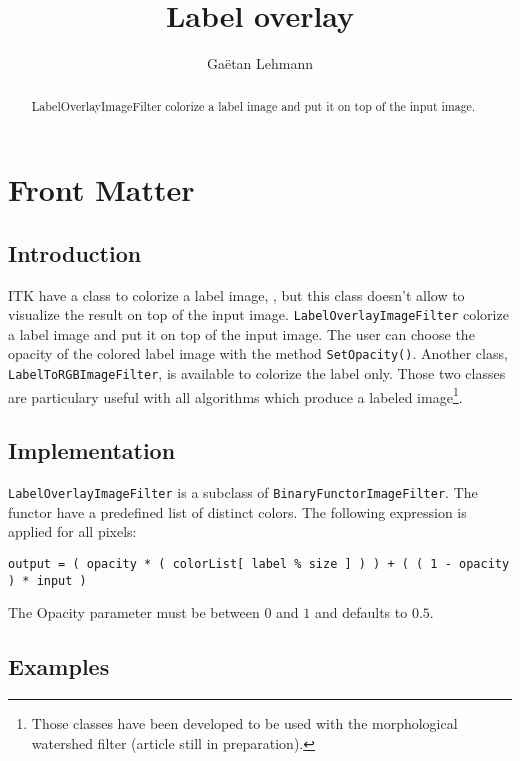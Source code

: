\documentclass{InsightArticle}
\title{Label overlay}
\author{Ga\"etan Lehmann}
\begin{document}
\maketitle

\ifhtml
\chapter*{Front Matter\label{front}}
\fi


\begin{abstract}
\noindent
LabelOverlayImageFilter colorize a label image and put it on top
of the input image.
\end{abstract}


\section{Introduction}

ITK have a class to colorize a label image, ,
but this class doesn't allow to visualize the result on top of the input
image. \verb$LabelOverlayImageFilter$ colorize a label image and put it on top
of the input image. The user can choose the opacity of the colored label image
with the method \verb$SetOpacity()$. Another class, \verb$LabelToRGBImageFilter$,
is available to colorize the label only.
Those two classes are particulary useful with all algorithms which produce a
labeled image\footnote{Those classes have been developed to be used with the
morphological watershed filter (article still in preparation).}.

\section{Implementation}

\verb$LabelOverlayImageFilter$ is a subclass of \verb$BinaryFunctorImageFilter$.
The functor have a predefined list of distinct colors. The following expression
is applied for all pixels:
\small \begin{verbatim}
output = ( opacity * ( colorList[ label % size ] ) ) + ( ( 1 - opacity ) * input )
\end{verbatim} \normalsize
The Opacity parameter must be between $0$ and $1$ and defaults to $0.5$.

\section{Examples}
\end{document}
